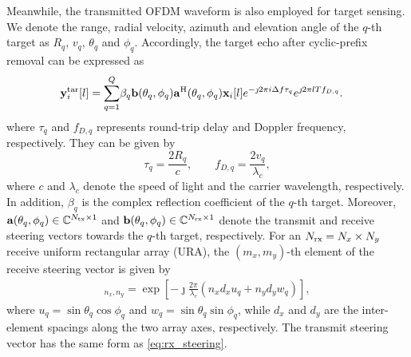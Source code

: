\documentclass[conference]{IEEEtran}
\begin{document}
Meanwhile, the transmitted OFDM waveform is also employed for target sensing. We denote the range, radial velocity, azimuth and elevation angle of the $q$-th target as $R_q$, $v_q$, $\theta_q$ and $\phi_q$. Accordingly, the target echo after cyclic-prefix removal can be expressed as
\begin{align}
\mathbf{y}_{i}^{\rm tar}[l]=\sum_{q=1}^{Q}
&\beta_q
\mathbf{b}(\theta_q,\phi_q)
\mathbf{a}^{\rm H}(\theta_q,\phi_q)
\mathbf{x}_i[l] 
e^{-\jmath2\pi i\Delta f\tau_q}
e^{\jmath2\pi lTf_{D,q}}.
\label{eq:target_echo}
\end{align}
where $\tau_q$ and $f_{D,q}$ represents round-trip delay and Doppler frequency, respectively. They can be given by
\begin{equation}
\tau_q=\frac{2R_q}{c},
\qquad
f_{D,q}=\frac{2v_q}{\lambda_c},
\label{eq:delay_doppler}
\end{equation}
where $c$ and $\lambda_c$ denote  the speed of light and the carrier wavelength, respectively. In addition, $\beta_q$ is the complex reflection coefficient of the $q$-th target. Moreover,  $\mathbf{a}(\theta_q,\phi_q)\in\mathbb{C}^{N_{\rm tx}\times1}$ and $\mathbf{b}(\theta_q,\phi_q)\in\mathbb{C}^{N_{\rm rx}\times1}$ denote the transmit and receive steering vectors towards the $q$-th target, respectively.  For an $N_{\rm rx}=N_x\times N_y$ receive uniform rectangular array (URA), the $(m_x,m_y)$-th element of the receive steering vector is given by
\begin{align}
[\mathbf{b}(\theta_q,\phi_q)]_{n_x,n_y}=\exp \left[
-\jmath\frac{2\pi}{\lambda_c}
\left( n_xd_xu_q+n_yd_yw_q \right) \right],
\label{eq:rx_steering}
\end{align}
where
$u_q=\sin\theta_q\cos\phi_q$ and $w_q=\sin\theta_q\sin\phi_q$, while $d_x$ and $d_y$ are the inter-element spacings along the two array axes, respectively. The transmit steering vector has the same form as \eqref{eq:rx_steering}.
\end{document}
